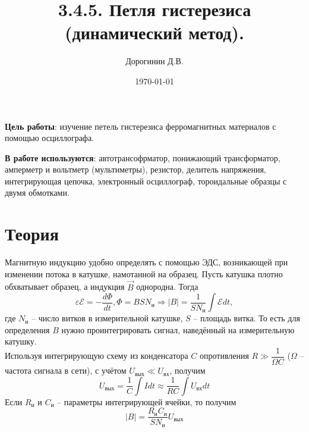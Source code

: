 \documentclass[a4paper,12pt]{article}
\author{Дорогинин Д.В.}
\title{3.4.5. Петля гистерезиса (динамический метод).}
\date{\today}
\begin{document}
\maketitle
\newpage
\textbf{Цель работы}: изучение петель гистерезиса ферромагнитных материалов с помощью осциллографа.


\textbf{В работе используются}: автотрансофрматор, понижающий трансформатор, амперметр и вольтметр (мультиметры), резистор, делитель напряжения, интегрирующая цепочка, электронный осциллограф, тороидальные образцы с двумя обмотками.
\section*{Теория}
Магнитную индукцию удобно определять с помощью ЭДС, возникающей при изменении потока в катушке, намотанной на образец. Пусть катушка плотно обхватывает образец, а индукция $\vec{B}$ однородна. Тогда
$$
\varepsilon \mathscr{E} = -\dfrac{d\Phi}{dt}, \Phi = BSN_\text{и} \Rightarrow |B|=\dfrac{1}{SN_\text{и}}\int \mathscr{E}dt,
$$
где $N_\text{и}$ -- число витков в измерительной катушке, $S$ -- площадь витка. То есть для определения $B$ нужно проинтегрировать сигнал, наведённый на измерительную катушку.\\
Используя интегрирующую схему из конденсатора $C$ опротивления $R \gg \dfrac{1}{\Omega C}$ ($\Omega$ -- частота сигнала в сети), с учётом $U_{\text{вых}} \ll U_{\text{вх}}$, получим
$$
U_{\text{вых}}=\dfrac{1}{C}\int Idt \approx \dfrac{1}{RC}\int U_{\text{вх}}dt
$$
Если $R_{\text{и}}$ и $C_{\text{и}}$ -- параметры интегрирующей ячейки, то получим
$$
|B| = \dfrac{R_{\text{и}}C_{\text{и}}}{SN_\text{и}}U_{\text{вых}}
$$
\end{document}
